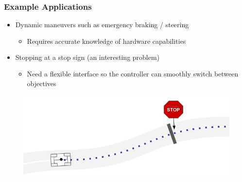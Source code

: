 \documentclass{beamer}
\begin{document}
\begin{frame}
\frametitle{Example Applications}
\begin{itemize}
	\item Dynamic maneuvers such as emergency braking / steering
	\begin{itemize}
		\item Requires accurate knowledge of hardware capabilities
	\end{itemize}
	\item Stopping at a stop sign (an interesting problem)
	\begin{itemize}
		\item Need a flexible interface so the controller can smoothly switch between objectives
	\end{itemize}
\end{itemize}
\begin{figure}
	\includegraphics[width=0.7\linewidth]{figures/stop_sign.png}
\end{figure}


\end{frame}

	

	
	
\end{document}
